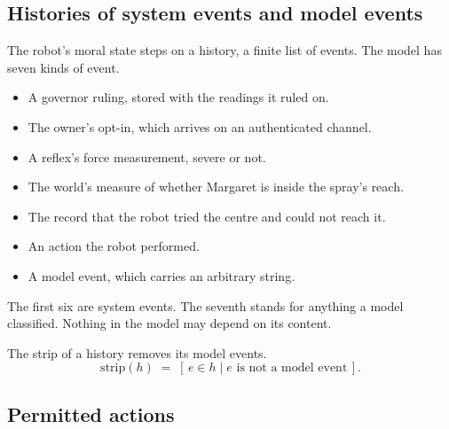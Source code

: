 \subsection{Histories of system events and model events}

The robot's moral state steps on a history, a finite list of events.
The model has seven kinds of event.
\begin{itemize}
  \item A governor ruling, stored with the readings it ruled on.
  \item The owner's opt-in, which arrives on an authenticated channel.
  \item A reflex's force measurement, severe or not.
  \item The world's measure of whether Margaret is inside the spray's reach.
  \item The record that the robot tried the centre and could not reach it.
  \item An action the robot performed.
  \item A model event, which carries an arbitrary string.
\end{itemize}
The first six are system events.
The seventh stands for anything a model classified.
Nothing in the model may depend on its content.

The strip of a history removes its model events.
\begin{equation}
  \mathrm{strip}(h) \;=\; [\, e \in h \mid e \text{ is not a model event} \,].
\end{equation}

\subsection{Permitted actions}

